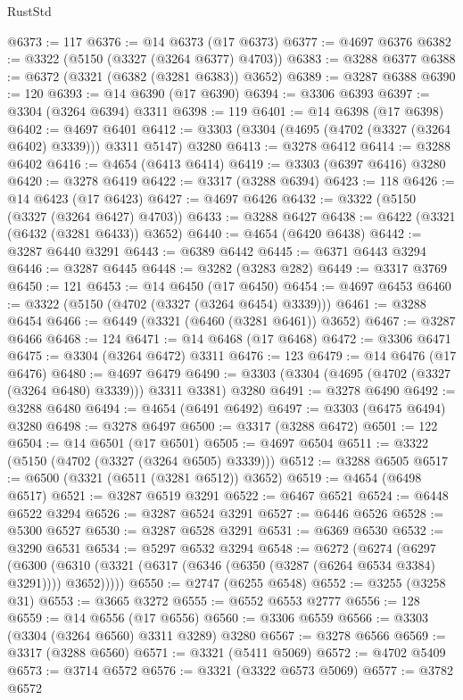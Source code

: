 \begin{lexlean}{RustStd}
\begin{coremodule}
{\begin{coremodule}
{{{{{{{{{{{{{{{{{{{{{{{{{{{{{{{{{@6373 := 117
@6376 := @14 @6373 (@17 @6373)
@6377 := @4697 @6376
@6382 := @3322 (@5150 (@3327 (@3264 @6377) @4703))
@6383 := @3288 @6377
@6388 := @6372 (@3321 (@6382 (@3281 @6383)) @3652)
@6389 := @3287 @6388
@6390 := 120
@6393 := @14 @6390 (@17 @6390)
@6394 := @3306 @6393
@6397 := @3304 (@3264 @6394) @3311
@6398 := 119
@6401 := @14 @6398 (@17 @6398)
@6402 := @4697 @6401
@6412 := @3303 (@3304 (@4695 (@4702 (@3327 (@3264 @6402) @3339))) @3311 @5147) @3280
@6413 := @3278 @6412
@6414 := @3288 @6402
@6416 := @4654 (@6413 @6414)
@6419 := @3303 (@6397 @6416) @3280
@6420 := @3278 @6419
@6422 := @3317 (@3288 @6394)
@6423 := 118
@6426 := @14 @6423 (@17 @6423)
@6427 := @4697 @6426
@6432 := @3322 (@5150 (@3327 (@3264 @6427) @4703))
@6433 := @3288 @6427
@6438 := @6422 (@3321 (@6432 (@3281 @6433)) @3652)
@6440 := @4654 (@6420 @6438)
@6442 := @3287 @6440 @3291
@6443 := @6389 @6442
@6445 := @6371 @6443 @3294
@6446 := @3287 @6445
@6448 := @3282 (@3283 @282)
@6449 := @3317 @3769
@6450 := 121
@6453 := @14 @6450 (@17 @6450)
@6454 := @4697 @6453
@6460 := @3322 (@5150 (@4702 (@3327 (@3264 @6454) @3339)))
@6461 := @3288 @6454
@6466 := @6449 (@3321 (@6460 (@3281 @6461)) @3652)
@6467 := @3287 @6466
@6468 := 124
@6471 := @14 @6468 (@17 @6468)
@6472 := @3306 @6471
@6475 := @3304 (@3264 @6472) @3311
@6476 := 123
@6479 := @14 @6476 (@17 @6476)
@6480 := @4697 @6479
@6490 := @3303 (@3304 (@4695 (@4702 (@3327 (@3264 @6480) @3339))) @3311 @3381) @3280
@6491 := @3278 @6490
@6492 := @3288 @6480
@6494 := @4654 (@6491 @6492)
@6497 := @3303 (@6475 @6494) @3280
@6498 := @3278 @6497
@6500 := @3317 (@3288 @6472)
@6501 := 122
@6504 := @14 @6501 (@17 @6501)
@6505 := @4697 @6504
@6511 := @3322 (@5150 (@4702 (@3327 (@3264 @6505) @3339)))
@6512 := @3288 @6505
@6517 := @6500 (@3321 (@6511 (@3281 @6512)) @3652)
@6519 := @4654 (@6498 @6517)
@6521 := @3287 @6519 @3291
@6522 := @6467 @6521
@6524 := @6448 @6522 @3294
@6526 := @3287 @6524 @3291
@6527 := @6446 @6526
@6528 := @5300 @6527
@6530 := @3287 @6528 @3291
@6531 := @6369 @6530
@6532 := @3290 @6531
@6534 := @5297 @6532 @3294
@6548 := @6272
    (@6274
      (@6297
        (@6300 (@6310 (@3321 (@6317 (@6346 (@6350 (@3287 (@6264 @6534 @3384) @3291)))) @3652)))))
@6550 := @2747 (@6255 @6548)
@6552 := @3255 (@3258 @31)
@6553 := @3665 @3272
@6555 := @6552 @6553 @2777
@6556 := 128
@6559 := @14 @6556 (@17 @6556)
@6560 := @3306 @6559
@6566 := @3303 (@3304 (@3264 @6560) @3311 @3289) @3280
@6567 := @3278 @6566
@6569 := @3317 (@3288 @6560)
@6571 := @3321 (@5411 @5069)
@6572 := @4702 @5409
@6573 := @3714 @6572
@6576 := @3321 (@3322 @6573 @5069)
@6577 := @3782 @6572
}}}}}}}}}}}}}}}}}}}}}}}}}}}}}}}}}
\end{coremodule}}
\end{coremodule}
\end{lexlean}
